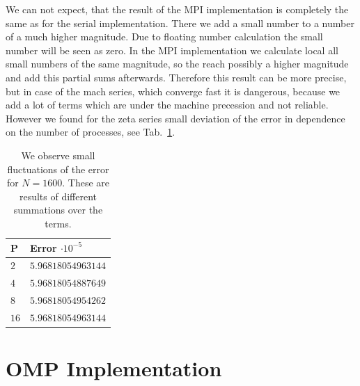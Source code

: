 We can not expect, that the result of the MPI implementation is completely the same as for the serial implementation. There we add a small number to a number of a much higher magnitude. Due to floating number calculation the small number will be seen as zero. In the MPI implementation we calculate local all small numbers of the same magnitude, so the reach possibly a higher magnitude and add this partial sums afterwards. Therefore this result can be more precise, but in case of the mach series, which converge fast it is dangerous, because we add a lot of terms which are under the machine precession and not reliable. However we found for the zeta series small deviation of the error in dependence on the number of processes, see Tab.~\ref{tab:error_dev}.
\begin{table}
\centering
    \begin{tabular}{| l | l |}
    
    \hline
    P & Error $\cdot 10^{-5}$ \\  \hline
    $2$ & $5.96818054963144$ \\
    $4$ & $5.96818054887649$ \\
    $8$ & $5.96818054954262$ \\    
    $16$ & $5.96818054963144$ \\
    \hline
    
    \end{tabular}
    \caption{We observe small fluctuations of the error for $N = 1600$. These are results of different summations over the terms.}
    \label{tab:error_dev}
\end{table}





\section{OMP Implementation}

